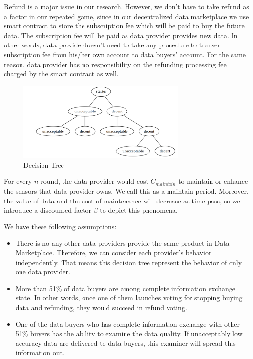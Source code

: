 \documentclass[journal,a4paper]{IEEEtran}
\begin{document}
Refund is a major issue in our research. However, we don't have to take refund as a factor in our repeated game, since in our decentralized data marketplace we use smart contract to store the subscription fee which will be paid to buy the future data. The subscription fee will be paid as data provider provides new data. In other words, data provide doesn't need to take any procedure to transer subscription fee from his/her own account to data buyers' account. For the same reason, data provider has no responsibility on the refunding processing fee charged by the smart contract as well.

\begin{figure} \centering \includegraphics[width=3.3in]{img/decision_tree.png} \caption{Decision Tree}
    \label{fig:decision_tree} \end{figure}
For every $n$ round, the data provider would cost $C_{maintain}$ to maintain or enhance the sensors that data provider owns. We call this as a maintain period. Moreover, the value of data and the cost of maintenance will decrease as time pass, so we introduce a discounted factor $\beta$ to depict this phenomena.

We have these following assumptions:
\begin{itemize}
\item  There is no any other data providers provide the same product in Data Marketplace. Therefore, we can consider each provider's behavior independently. That means this decision tree represent the behavior of only one data provider.
\item  More than 51\% of data buyers are among complete information exchange state. In other words, once one of them launches voting for stopping buying data and refunding, they would succeed in refund voting.
\item  One of the data buyers who has complete information exchange with other 51\% buyers has the ability to examine the data quality. If unacceptably low accuracy data are delivered to data buyers, this examiner will spread this information out.
\end{itemize}
\end{document}
